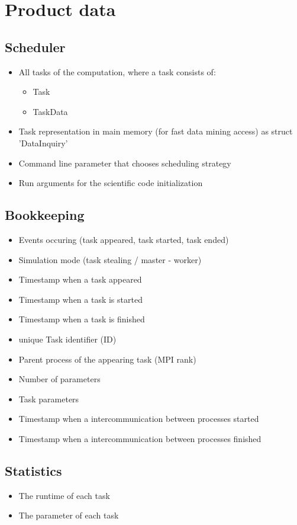 {


\setcounter{funcD}{10}
\renewcommand{\labelitemi}{
	\ifnum \value{funcD}<10$/D 0\arabic{funcD} /$\addtocounter{funcD}{10}
	\else $/D \arabic{funcD} /$\addtocounter{funcD}{10}\fi
	}
\section{Product data}

	\subsection{Scheduler}
		\begin{itemize}
			\item All tasks of the computation, where a task consists of:
				\begin{itemize}
					\item Task
					\item TaskData
				\end{itemize}
			\item Task representation in main memory (for fast data mining access) as struct 'DataInquiry'
			\item Command line parameter that chooses scheduling strategy
			\item Run arguments for the scientific code initialization
		\end{itemize}


	\subsection{Bookkeeping}
		\begin{itemize}
			\item Events occuring (task appeared, task started, task ended)
			\item Simulation mode (task stealing / master - worker)
			\item Timestamp when a task appeared
			\item Timestamp when a task is started
			\item Timestamp when a task is finished
			\item unique Task identifier (ID)
			\item Parent process of the appearing task (MPI rank)
			\item Number of parameters
			\item Task parameters
			\item Timestamp when a intercommunication between processes started
			\item Timestamp when a intercommunication between processes finished
		\end{itemize}
			
			
	\subsection{Statistics}
		\begin{itemize}
			\item The runtime of each task
			\item The parameter of each task
		\end{itemize}
}